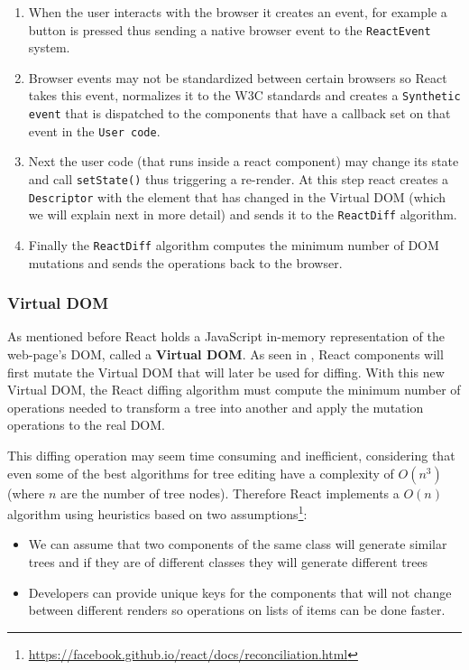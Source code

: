 \begin{enumerate}
	\item When the user interacts with the browser it creates an event, for example a button is pressed thus sending a native browser event to the \texttt{ReactEvent} system.
	\item  Browser events may not be standardized between certain browsers so React takes this event, normalizes it to the W3C standards and creates a \texttt{Synthetic event} that is dispatched to the components that have a callback set on that event in the \texttt{User code}.
	\item Next the user code (that runs inside a react component) may change its state and call \texttt{setState()} thus triggering a re-render. At this step react creates a \texttt{Descriptor} with the element that has changed in the Virtual DOM (which we will explain next in more detail) and sends it to the \texttt{ReactDiff} algorithm.
	\item Finally the \texttt{ReactDiff} algorithm computes the minimum number of DOM mutations and sends the operations back to the browser.
\end{enumerate}


\subsubsection{Virtual DOM}
\label{sub-sub-sec:virtual-dom}

As mentioned before React holds a JavaScript in-memory representation of the web-page's DOM, called a \textbf{Virtual DOM}. As seen in , React components will first mutate the Virtual DOM that will later be used for diffing. With this new Virtual DOM, the React diffing algorithm must compute the minimum number of operations needed to transform a tree into another and apply the mutation operations to the real DOM.


This diffing operation may seem time consuming and inefficient, considering that even some of the best algorithms for tree editing have a complexity of $O(n^3)$\cite{trees} (where $n$ are the number of tree nodes). Therefore React implements a $O(n)$ algorithm using heuristics based on two assumptions\footnote{\url{https://facebook.github.io/react/docs/reconciliation.html}}:

\begin{itemize}
	\item We can assume that two components of the same class will generate similar trees and if they are of different classes they will generate different trees
	\item Developers can provide unique keys for the components that will not change between different renders so operations on lists of items can be done faster.
\end{itemize}




